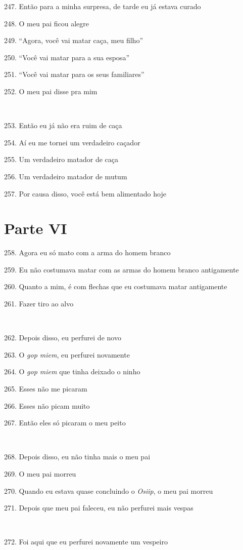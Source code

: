 247. Então para a minha surpresa, de tarde eu já estava curado

248. O meu pai ficou alegre

249. ``Agora, você vai matar caça, meu filho''

250. ``Você vai matar para a sua esposa''

251. ``Você vai matar para os seus familiares''

252. O meu pai disse pra mim

~

253. Então eu já não era ruim de caça

254. Aí eu me tornei um verdadeiro caçador

255. Um verdadeiro matador de caça

256. Um verdadeiro matador de mutum

257. Por causa disso, você está bem alimentado hoje

\section{Parte VI}

258. Agora eu só mato com a arma do homem branco

259. Eu não costumava matar com as armas do homem branco antigamente

260. Quanto a mim, é com flechas que eu costumava matar antigamente

261. Fazer tiro ao alvo

~

262. Depois disso, eu perfurei de novo

263. O \emph{gop miem}, eu perfurei novamente

264. O \emph{gop miem} que tinha deixado o ninho

265. Esses não me picaram

266. Esses não picam muito

267. Então eles só picaram o meu peito

~

268. Depois disso, eu não tinha mais o meu pai

269. O meu pai morreu

270. Quando eu estava quase concluindo o \emph{Osiip}, o meu pai morreu

271. Depois que meu pai faleceu, eu não perfurei mais vespas

~

272. Foi aqui que eu perfurei novamente um vespeiro

